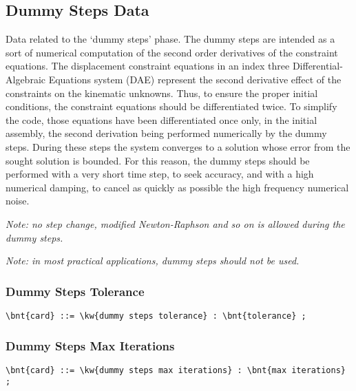 \subsection{Dummy Steps Data}
Data related to the `dummy steps' phase.
The dummy steps are intended as a sort of numerical computation 
of the second order derivatives of the constraint equations. 
The displacement constraint equations in an index three 
Differential-Algebraic Equations system
(DAE) represent the second derivative effect of the constraints on the
kinematic unknowns. Thus, to ensure the proper initial conditions, the
constraint equations should be differentiated twice. To simplify the code,
those equations have been differentiated once only, in the initial assembly,
the second derivation being performed numerically by the dummy steps.
During these steps the system converges to a solution whose error from
the sought solution is bounded. For this reason, the dummy steps
should be performed with a very short time step, to seek accuracy, and
with a high numerical damping, to cancel as quickly as possible the high
frequency numerical noise.

\emph{Note: no step change, modified Newton-Raphson and so on is allowed
    during the dummy steps.}

\emph{Note: in most practical applications, dummy steps should not be used.}


\subsubsection{Dummy Steps Tolerance}
\begin{Verbatim}[commandchars=\\\{\}]
    \bnt{card} ::= \kw{dummy steps tolerance} : \bnt{tolerance} ;
\end{Verbatim}

\subsubsection{Dummy Steps Max Iterations}
\begin{Verbatim}[commandchars=\\\{\}]
    \bnt{card} ::= \kw{dummy steps max iterations} : \bnt{max iterations} ;
\end{Verbatim}    

